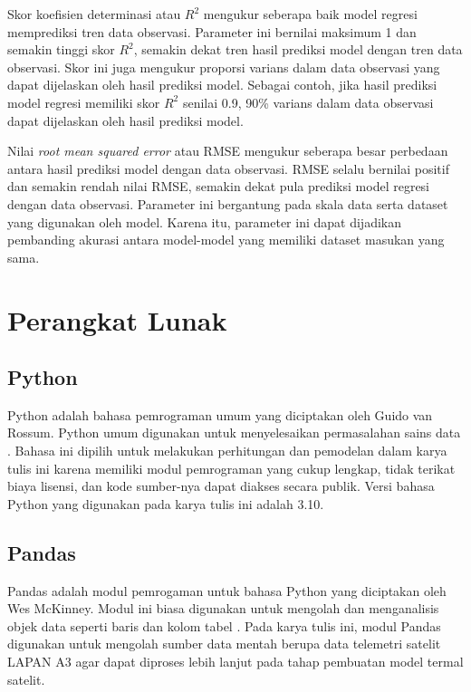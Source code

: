 Skor koefisien determinasi atau $R^2$ mengukur seberapa baik model regresi
memprediksi tren data observasi. Parameter ini bernilai maksimum 1 dan semakin
tinggi skor $R^2$, semakin dekat tren hasil prediksi model dengan tren data
observasi. Skor ini juga mengukur proporsi varians dalam data observasi yang
dapat dijelaskan oleh hasil prediksi model. Sebagai contoh, jika hasil prediksi
model regresi memiliki skor $R^2$ senilai 0.9, 90\% varians dalam data
observasi dapat dijelaskan oleh hasil prediksi model.

Nilai \textit{root mean squared error} atau RMSE mengukur seberapa besar
perbedaan antara hasil prediksi model dengan data observasi. RMSE selalu
bernilai positif dan semakin rendah nilai RMSE, semakin dekat pula prediksi
model regresi dengan data observasi. Parameter ini bergantung pada skala data
serta dataset yang digunakan oleh model. Karena itu, parameter ini dapat
dijadikan pembanding akurasi antara model-model yang memiliki dataset masukan
yang sama.

\section{Perangkat Lunak}

\subsection{Python}

Python adalah bahasa pemrograman umum yang diciptakan oleh Guido van
Rossum. Python umum digunakan untuk menyelesaikan permasalahan sains
data \cite{boschetti2015}. Bahasa ini dipilih untuk melakukan perhitungan dan
pemodelan dalam karya tulis ini karena memiliki modul pemrograman yang
cukup lengkap, tidak terikat biaya lisensi, dan kode sumber-nya dapat
diakses secara publik. Versi bahasa Python yang digunakan pada karya
tulis ini adalah 3.10.

\subsection{Pandas}

Pandas adalah modul pemrogaman untuk bahasa Python yang diciptakan oleh Wes
McKinney. Modul ini biasa digunakan untuk mengolah dan menganalisis objek data
seperti baris dan kolom tabel \cite{reback2022}. Pada karya tulis ini, modul Pandas
digunakan untuk mengolah sumber data mentah berupa data telemetri satelit LAPAN
A3 agar dapat diproses lebih lanjut pada tahap pembuatan model termal satelit.

